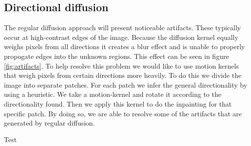 \subsection{Directional diffusion}

The regular diffusion approach will present noticeable artifacts. These typically occur at high-contrast edges of the image. Because the diffusion kernel equally weighs pixels from all directions it creates a blur effect and is unable to properly propogate edges into the unknown regions. This effect can be seen in figure \ref{fig:artifacts}. To help resolve this problem we would like to use motion kernels that weigh pixels from certain directions more heavily. To do this we divide the image into separate patches. For each patch we infer the general directionality by using a heuristic. We take a motion-kernel and rotate it according to the directionality found. Then we apply this kernel to do the inpainting for that specific patch. By doing so, we are able to resolve some of the artifacts that are generated by regular diffusion.

Test

